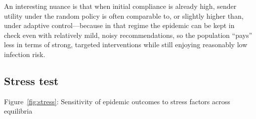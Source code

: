 \documentclass[sigconf,review]{acmart}
\begin{document}
An interesting nuance is that when initial compliance is already high, sender utility under the random policy is often comparable to, or slightly higher than, under adaptive control—because in that regime the epidemic can be kept in check even with relatively mild, noisy recommendations, so the population “pays” less in terms of strong, targeted interventions while still enjoying reasonably low infection risk.


\subsection{Stress test}
Figure~\ref{fig:stress}: Sensitivity of epidemic outcomes to stress factors across equilibria
\end{document}

